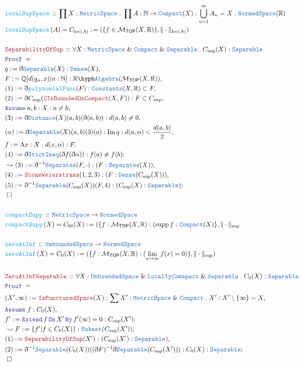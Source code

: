 \documentclass[12pt]{scrartcl}
\newcommand{\TYPE}[1]{\textcolor{NavyBlue}{\mathtt{#1}}}
\newcommand{\FUNC}[1]{\textcolor{Cerulean}{\mathtt{#1}}}
\newcommand{\LOGIC}[1]{\textcolor{Blue}{\mathtt{#1}}}
\newcommand{\THM}[1]{\textcolor{Maroon}{\mathtt{#1}}}
\renewcommand{\.}{\; . \;}
\newcommand{\de}{: \kern 0.1pc =}
\newcommand{\Act}[1]{\left( #1 \right)}
\newcommand{\Theorem}[2]{& \THM{#1} \, :: \, #2 \\ & \Proof = \\ }
\newcommand{\DeclareFunc}[2]{& \FUNC{#1} \, :: \, #2 \\}
\newcommand{\DefineNamedFunc}[4]{&  \FUNC{#1}\Act{#2} = #3 \de #4 \\}
\renewcommand{\And}{\; \& \;}
\newcommand{\Reals}{\mathbb{R} }
\newcommand{\Rats}{\mathbb{Q} }
\newcommand{\Nat}{\mathbb{N} }
\newcommand{\Say}[3]{& #1 \de #2 : #3, \\}
\newcommand{\Conclude}[3]{& #1 \de #2 : #3; \\}
\newcommand{\Derive}[3]{& \leadsto #1 \de #2 : #3, \\}
\newcommand{\A}{\LOGIC{Assume} \;}
\newcommand{\Assume}[2]{& \A #1 : #2, \\}
\newcommand{\QED}{\; \square}
\newcommand{\EndProof}{& \QED \\}
\newcommand{\ByDef}{\eth}
\newcommand{\Proof}{\LOGIC{Proof} \; }
\newcommand{\Mor}{\mathcal{M}}
\newcommand{\MS}{\TYPE{MetricSpace}}
\newcommand{\Sep}{\TYPE{Separable}}
\newcommand{\LC}{\TYPE{LocallyComapact}}
\newcommand{\Compact}{\TYPE{Compact}}
\newcommand{\Dense}{\TYPE{Dense}}
\newcommand{\TOP}{ \mathsf{TOP}  }
\newcommand{\supp}{ \mathrm{supp} \, }
\begin{document}
\newpage
\begin{align*}
\DeclareFunc{ localSupSpace  }{ \prod X : \MS \.  \prod A : \Nat \to \TYPE{Compact}( X ) : \bigcup^\infty_{n = 1} A_n =  X \. \TYPE{NormedSpace}(\Reals)   }
\DefineNamedFunc{ localSupSpace  }{ A  }{ C_{\mathrm{loc}(A)}  }{ ( \{ f \in \Mor_{\mathsf{TOP}}(X,\Reals) \} , \| \cdot \|_{\mathrm{loc}(A)}) }
\\
\Theorem{ SeparabilityOfSup }{\forall X : \MS \And \TYPE{Compact} \And \Sep  \.  C_{\sup}(X) : \Sep }
\Say{ q }{ \ByDef\Sep(X) }{ \TYPE{Dense}(X) }
\Say{ F }{ \Rats[ d(q_n, x) | n : \Nat  ]   }{ \Reals \hyph \TYPE{ Algebra }(\Mor_{\mathsf{TOP}}(X,\Reals))  } 
\Say{(1)}{ \ByDef\FUNC{polynomialFunc}(F) }{ \TYPE{Constants}(X, \Reals) \subset F  }
\Say{(2)}{  \ByDef C_{\sup} ( \THM{CIsBoundedOnCompact}(X,F))  }{  F \subset C_{\sup}  }
\Assume{ a,b  }{ X : a \neq b }
\Say{ (3) }{ \ByDef \TYPE{Distance}(X)(a,b)( \ByDef(a,b))   }{ d(a,b) \neq 0  }
\Say{ (\alpha) }{ \ByDef \TYPE{Separable}(X)(a,b)(3)(a) }{  \mathrm{Im} \,  q  :  d(a,\alpha) < \frac{d(a,b)}{2}  }
\Say{ f }{ \Lambda x : X \. d(x, \alpha)    }{F}
\Conclude{ (4)   }{ \ByDef \TYPE{StictIneq}(\ByDef f ( \ByDef{\alpha} ) )   }{ f(a) \neq f(b) }
\Derive{ (3)  }{ \ByDef^{-1} \TYPE{Separates}(F, \cdot)  }{ ( F : \TYPE{Separates}(X)  )   }
\Say{ (4)  }{ \THM{StoneWeierstrass}(1,2,3) }{ (F : \Dense(C_{\sup}(X)))  }
\Conclude{ (5) }{  \ByDef^{-1} \Sep (C_{\sup}(X))(F,4) }{  (C_{\sup}(X)  : \Sep )  } 
\EndProof
\\
\DeclareFunc{ compactSupp  }{ \MS \to \TYPE{NormedSpace}   }
\DefineNamedFunc{ compactSupp   }{X}{C_{00}(X)}{ (\{ f: \Mor_{\TOP}(X,\Reals) : (\supp  f : \Compact (X)  \}, \| \cdot \|_{\sup}   }
\\
\DeclareFunc{ zeroAtInf }{ \TYPE{UnboundedSpace} \to \TYPE{NormedSpace} }
\DefineNamedFunc{ zeroAtInf  }{X}{ C_{0}(X) }{ (\{ f : \Mor_{\TOP}(X,\Reals) : ( \lim_{x \to \infty} f(x) = 0    )   \}, \| \cdot \|_{\sup} )  }
\\
\Theorem{ZeroAtInfSeparable}{ \forall X :  \TYPE{UnboundedSpace} \And \LC \And \Sep \. C_0(X) : \Sep      }
\Say{(X',\infty)}{\THM{IsPuncturedSpace}(X)}{ \sum X' : \MS \And \Compact \. X' : X' \setminus \{\infty\} = X }
\Assume{f}{C_0(X)}
\Conclude{ f' }{ \LOGIC{ Extend} \, f \, \LOGIC{On} \,  X' \, \LOGIC{By} \, f'(\infty) = 0 }{ C_{\sup}(X') }
\Derive{F}{ \{ f' | f \in C_0(X) \} }{ \TYPE{Subset}(C_{\sup}(X'))  }
\Say{(1)}{ \THM{SeparabilityOfSup}(X')}{ ( C_{\sup}(X') : \Sep)  }
\Conclude{(2)}{ \ByDef^{-1} \Sep(C_0(X))( (\ByDef F)^{-1} \ByDef \Sep(C_{\sup}(X'))  ) }{ C_0(X) : \Sep    }
\EndProof
\end{align*}
\end{document}
